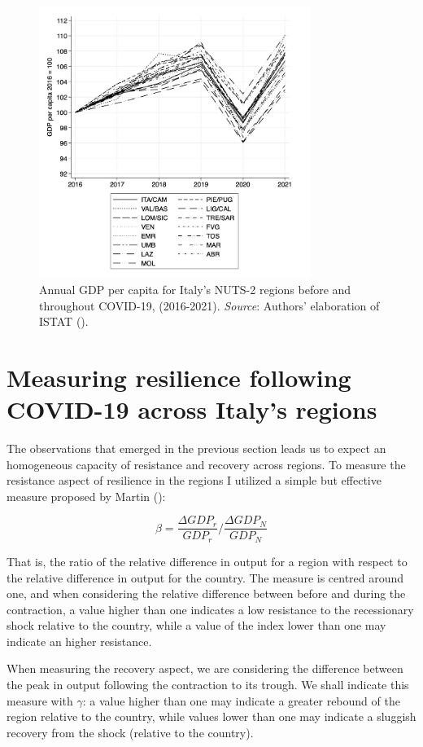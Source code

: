 \documentclass[12pt]{article}
\begin{document}
\begin{figure}[H]
        \centering
        \includegraphics[width=250pt]{n2_gdpy.pdf}
        \caption{Annual GDP per capita for Italy's NUTS-2 regions before and throughout COVID-19, (2016-2021). \textit{Source}: Authors’ elaboration of ISTAT (\citeyear{istat}).}
        \label{fig:GDPN2}
\end{figure}
    


\section{Measuring resilience following COVID-19 across Italy's regions}
The observations that emerged in the previous section leads us to expect an homogeneous capacity of resistance and recovery across regions. To measure the resistance aspect of resilience in the regions I utilized a simple but effective measure proposed by Martin (\citeyear{martin_regional_2012}):

\begin{equation}
    \beta = \frac{\Delta GDP_{r}}{GDP_{r}}/\frac{\Delta GDP_{N}}{GDP_{N}}
\end{equation}

That is, the ratio of the relative difference in output for a region with respect to the relative difference in output for the country. The measure is centred around one, and when considering the relative difference between before and during the contraction, a value higher than one indicates a low resistance to the recessionary shock relative to the country, while a value of the index lower than one may indicate an higher resistance.

When measuring the recovery aspect, we are considering the difference between the peak in output following the contraction to its trough. We shall indicate this measure with \textit{$\gamma$}: a value higher than one may indicate a greater rebound of the region relative to the country, while values lower than one may indicate a sluggish recovery from the shock (relative to the country).
\end{document}
